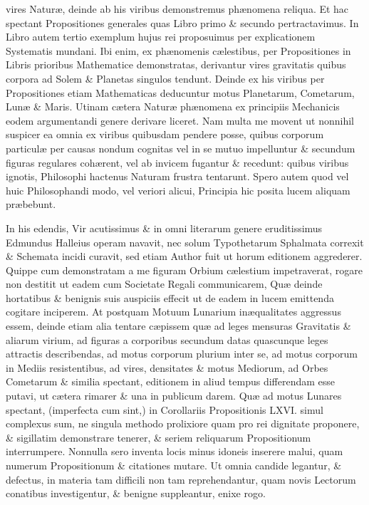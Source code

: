 \documentclass{ansarticle}
\begin{document}
vires Natur\ae{}, deinde ab his viribus demonstremus ph\ae{}nomena reliqua. Et
hac spectant Propositiones generales quas Libro primo \& secundo
pertractavimus. In Libro autem tertio exemplum hujus rei proposuimus
per explicationem Systematis mundani. Ibi enim, ex ph\ae{}nomenis
c\ae{}lestibus, per Propositiones in Libris prioribus Mathematice
demonstratas, derivantur vires gravitatis quibus corpora ad Solem \&
Planetas singulos tendunt. Deinde ex his viribus per Propositiones
etiam Mathematicas deducuntur motus Planetarum, Cometarum, Lun\ae{} \&
Maris. Utinam c\ae{}tera Natur\ae{} ph\ae{}nomena ex principiis Mechanicis eodem
argumentandi genere derivare liceret. Nam multa me movent ut nonnihil
suspicer ea omnia ex viribus quibusdam pendere posse, quibus corporum
particul\ae{} per causas nondum cognitas vel in se mutuo impelluntur \&
secundum figuras regulares coh\ae{}rent, vel ab invicem fugantur \&
recedunt: quibus viribus ignotis, Philosophi hactenus Naturam frustra
tentarunt. Spero autem quod vel huic Philosophandi modo, vel veriori
alicui, Principia hic posita lucem aliquam pr\ae{}bebunt.

In his edendis, Vir acutissimus \& in omni literarum genere
eruditissimus Edmundus Halleius operam navavit, nec solum Typothetarum
Sphalmata correxit \& Schemata incidi curavit, sed etiam Author fuit ut
horum editionem aggrederer. Quippe cum demonstratam a me figuram
Orbium c\ae{}lestium impetraverat, rogare non destitit ut eadem cum
Societate Regali communicarem, Qu\ae{} deinde hortatibus \& benignis suis
auspiciis effecit ut de eadem in lucem emittenda cogitare
inciperem. At postquam Motuum Lunarium in\ae{}qualitates aggressus essem,
deinde etiam alia tentare c\ae{}pissem qu\ae{} ad leges mensuras Gravitatis \&
aliarum virium, ad figuras a corporibus secundum datas quascunque
leges attractis describendas, ad motus corporum plurium inter se, ad
motus corporum in Mediis resistentibus, ad vires, densitates \& motus
Mediorum, ad Orbes Cometarum \& similia spectant, editionem in aliud
tempus differendam esse putavi, ut c\ae{}tera rimarer \& una in publicum
darem. Qu\ae{} ad motus Lunares spectant, (imperfecta cum sint,) in
Corollariis Propositionis LXVI. simul complexus sum, ne singula
methodo prolixiore quam pro rei dignitate proponere, \& sigillatim
demonstrare tenerer, \& seriem reliquarum Propositionum
interrumpere. Nonnulla sero inventa locis minus idoneis inserere
malui, quam numerum Propositionum \& citationes mutare. Ut omnia
candide legantur, \& defectus, in materia tam difficili non tam
reprehendantur, quam novis Lectorum conatibus investigentur, \& benigne
suppleantur, enixe rogo.
\end{document}
